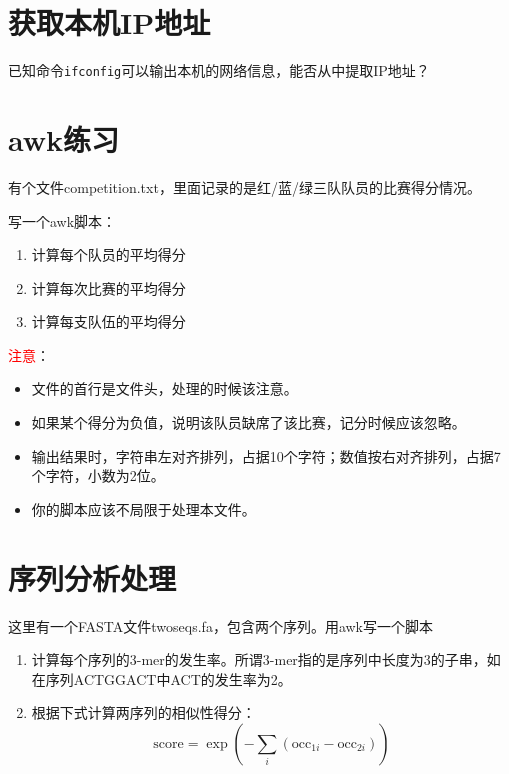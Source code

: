 \documentclass[12pt]{article}
\begin{document}
\begin{CJK*}{UTF8}{gbsn}
\section{获取本机IP地址}

已知命令\lstinline{ifconfig}可以输出本机的网络信息，能否从中提取IP地址？


\section{awk练习}

有个文件competition.txt，里面记录的是红/蓝/绿三队队员的比赛得分情况。

写一个awk脚本：
\begin{enumerate}
	\item 计算每个队员的平均得分
	\item 计算每次比赛的平均得分
	\item 计算每支队伍的平均得分
\end{enumerate}

\textcolor{red}{注意}：
\begin{itemize}
	\item 文件的首行是文件头，处理的时候该注意。
	\item 如果某个得分为负值，说明该队员缺席了该比赛，记分时候应该忽略。
	\item 输出结果时，字符串左对齐排列，占据10个字符；数值按右对齐排列，占据7个字符，小数为2位。
	\item 你的脚本应该不局限于处理本文件。
\end{itemize}


\section{序列分析处理}

这里有一个FASTA文件twoseqs.fa，包含两个序列。用awk写一个脚本
\begin{enumerate}[(1)]
	\item 计算每个序列的3-mer的发生率。所谓3-mer指的是序列中长度为3的子串，如在序列ACTGGACT中ACT的发生率为2。
	\item 根据下式计算两序列的相似性得分：
$$
\textrm{score} = \exp(-\sum_i (\text{occ}_{1i} - \text{occ}_{2i}))
$$
\end{enumerate}


\end{CJK*}
\end{document}
